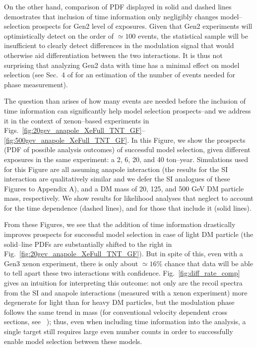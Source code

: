 \documentclass[11pt]{article}
\newcommand{\Fig}[1]{Fig.~\ref{#1}} \newcommand{\Figs}[2]{Figs.~\ref{#1} and \ref{#2}}
\begin{document}
On the other hand, comparison of PDF displayed in solid and dashed lines demostrates that inclusion of time information only negligibly changes model--selection prospects for Gen2 level of exposures. Given that Gen2 experiments will optimistically detect on the order of $\simeq 100$ events, the statistical sample will be insufficient to clearly detect differences in the modulation signal that would otherwise aid differentiation between the two interactions. It is thus not surprising that analyzing Gen2 data with time has a minimal effect on model selection (see \eg Sec.~4 of \cite{DelNobile:2015nua} for an estimation of the number of events needed for phase measurement).

The question than arises of how many events are needed before the inclusion of time information can significantly help model selection prospects--and we address it in the context of xenon--based experiments in Figs.~\ref{fig:20gev_anapole_XeFull_TNT_GF}--\ref{fig:500gev_anapole_XeFull_TNT_GF}. In this Figure, we show the prospects (PDF of possible analysis outcomes) of successful model selection, given different exposures in the same experiment: a 2, 6, 20, and 40 ton--year. Simulations used for this Figure are all assuming anapole interaction (the results for the SI interaction are qualitatively similar and we defer the SI analogues of these Figures to Appendix A), and a DM mass of 20, 125, and 500 GeV DM particle mass, respectively. We show results for likelihood analyses that neglect to account for the time dependence (dashed lines), and for those that include it (solid lines). 

From these Figures, we see that the addition of time information drastically improves prospects for successful model selection in case of light DM particle (the solid--line PDFs are substantially shifted to the right in \Fig{fig:20gev_anapole_XeFull_TNT_GF}). But in spite of this, even with a Gen3 xenon experiment, there is only about $\simeq 16\%$ chance that data will be able to tell apart these two interactions with confidence. \Fig{fig:diff_rate_comp} gives an intuition for interpreting this outcome: not only are the recoil spectra from the SI and anapole interactions (measured with a xenon experiment) more degenerate for light than for heavy DM particles, but the modulation phase follows the same trend in mass (for conventional velocity dependent cross sections, see ~\cite{DelNobile:2015tza,DelNobile:2015rmp}); thus, even when including time information into the analysis, a single target still requires large even number counts in order to successfully enable model selection between these models.
\end{document}
